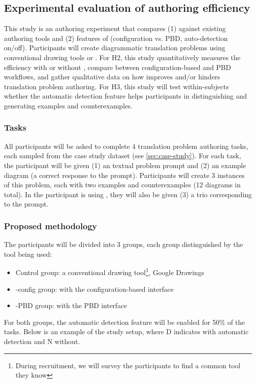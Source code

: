 \subsection{Experimental evaluation of authoring efficiency}

This study is an authoring experiment that compares (1) \Edgeworth against existing authoring tools and (2) features of \Edgeworth (\eg configuration vs. PBD, auto-detection on/off). Participants will create diagrammatic translation problems using conventional drawing tools or \Edgeworth. For H2, this study quantitatively measures the efficiency with or without \Edgeworth, compare between configuration-based and PBD workflows, and gather qualitative data on how \Edgeworth improves and/or hinders translation problem authoring. For H3, this study will test within-subjects whether the automatic detection feature helps participants in distinguishing and generating examples and counterexamples. 

\subsubsection{Tasks}

All participants will be asked to complete 4 translation problem authoring tasks, each sampled from the case study dataset (see \cref{sec:case-study}). For each task, the participant will be given (1) an textual problem prompt and (2) an example diagram (\ie a correct response to the prompt). Participants will create 3 instances of this problem, each with two examples and counterexamples (12 diagrams in total). In the participant is using \Edgeworth, they will also be given (3) a \Penrose trio corresponding to the prompt. 

\subsubsection{Proposed methodology}

The participants will be divided into 3 groups, each group distinguished by the tool being used: 
\begin{itemize}
    \item Control group: a conventional drawing tool\footnote{During recruitment, we will survey the participants to find a common tool they know}, \eg Google Drawings
    \item \Edgeworth-config group: \Edgeworth with the configuration-based interface
    \item \Edgeworth-PBD group: \Edgeworth with the PBD interface
\end{itemize}
For both \Edgeworth groups, the automatic detection feature will be enabled for 50\% of the tasks. Below is an example of the study setup, where D indicates \Edgeworth with automatic detection and N without.

